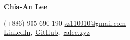 \documentclass[letterpaper,11pt]{article}
\begin{document}
  


    
    
  
\begin{center}
    \textbf{{\Huge Chia-An Lee}}\\
    \vspace{0.5em}
    
    \color{black}(+886) 905-690-190
    \color{blue}\href{mailto:sz110010@gmail.com}{sz110010@gmail.com}\\
    \color{blue}\href{https://www.linkedin.com/in/calee0219/}{LinkedIn}\color{black}$,$ \color{blue}\href{https://github.com/calee0219}{GitHub}\color{black}$,$ \color{blue}\href{https://calee.xyz/}{calee.xyz}
    
\end{center}
\vspace{-1em}

\end{document}
